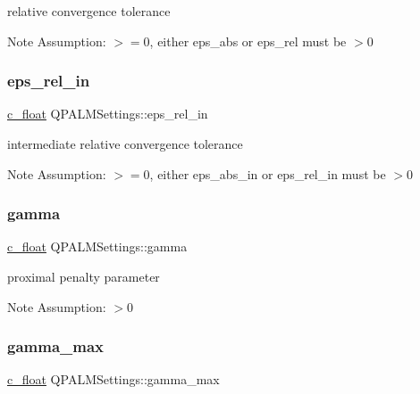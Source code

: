 relative convergence tolerance 

\begin{DoxyNote}{Note}
Assumption\+: $>=0$, either eps\+\_\+abs or eps\+\_\+rel must be $>0$ 
\end{DoxyNote}
\mbox{\label{structQPALMSettings_a3772b3f15b95f5d913f9a7e892e070dd}} 
\subsubsection{\texorpdfstring{eps\_rel\_in}{eps\_rel\_in}}
{\footnotesize\ttfamily \mbox{\hyperlink{global__opts_8h_a7f1a9fda95e52979658c20a0d134fb15}{c\+\_\+float}} Q\+P\+A\+L\+M\+Settings\+::eps\+\_\+rel\+\_\+in}



intermediate relative convergence tolerance 

\begin{DoxyNote}{Note}
Assumption\+: $>=0$, either eps\+\_\+abs\+\_\+in or eps\+\_\+rel\+\_\+in must be $>0$ 
\end{DoxyNote}
\mbox{\label{structQPALMSettings_a6e6a16baafbbee10a6639afb52d244ff}} 
\subsubsection{\texorpdfstring{gamma}{gamma}}
{\footnotesize\ttfamily \mbox{\hyperlink{global__opts_8h_a7f1a9fda95e52979658c20a0d134fb15}{c\+\_\+float}} Q\+P\+A\+L\+M\+Settings\+::gamma}



proximal penalty parameter 

\begin{DoxyNote}{Note}
Assumption\+: $>0$ 
\end{DoxyNote}
\mbox{\label{structQPALMSettings_a0ccd9f78a4d34dec26455c641734a394}} 
\subsubsection{\texorpdfstring{gamma\_max}{gamma\_max}}
{\footnotesize\ttfamily \mbox{\hyperlink{global__opts_8h_a7f1a9fda95e52979658c20a0d134fb15}{c\+\_\+float}} Q\+P\+A\+L\+M\+Settings\+::gamma\+\_\+max}



